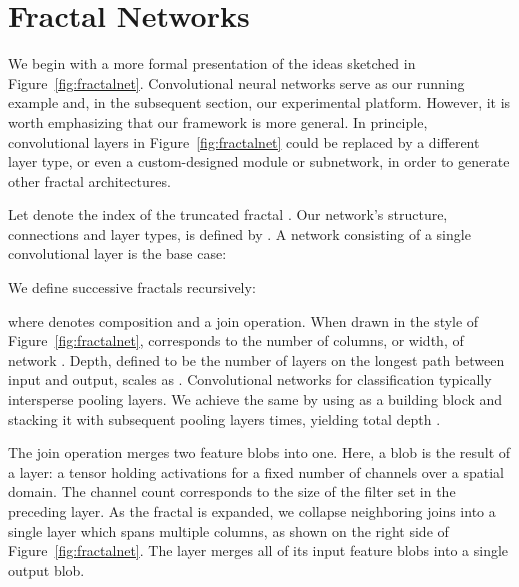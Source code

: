 \documentclass{article}
\begin{document}
\section{Fractal Networks}
\label{sec:method}
We begin with a more formal presentation of the ideas sketched in
Figure~\ref{fig:fractalnet}.  Convolutional neural networks serve as our
running example and, in the subsequent section, our experimental platform.
However, it is worth emphasizing that our framework is more general.  In
principle, convolutional layers in Figure~\ref{fig:fractalnet} could be
replaced by a different layer type, or even a custom-designed module or
subnetwork, in order to generate other fractal architectures.

Let  denote the index of the truncated fractal .  Our network's
structure, connections and layer types, is defined by .  A network
consisting of a single convolutional layer is the base case:

We define successive fractals recursively:

where  denotes composition and  a join operation.  When drawn
in the style of Figure~\ref{fig:fractalnet},  corresponds to the number of
columns, or width, of network .  Depth, defined to be the number of
 layers on the longest path between input and output, scales as
.  Convolutional networks for classification typically intersperse
pooling layers.  We achieve the same by using  as a building block
and stacking it with subsequent pooling layers  times, yielding total depth
.

The join operation  merges two feature blobs into one.  Here, a blob
is the result of a  layer: a tensor holding activations for a
fixed number of channels over a spatial domain.  The channel count corresponds
to the size of the filter set in the preceding  layer.  As the
fractal is expanded, we collapse neighboring joins into a single
 layer which spans multiple columns, as shown on the right side
of Figure~\ref{fig:fractalnet}.  The  layer merges all of its
input feature blobs into a single output blob.
\end{document}
